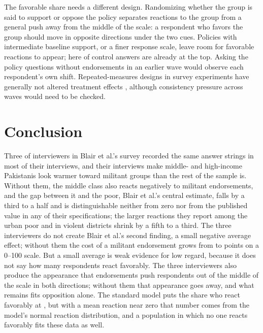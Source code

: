 \documentclass[11pt,letterpaper]{article}
\begin{document}
The favorable share needs a different design. Randomizing whether the group is said to support or oppose the policy separates reactions to the group from a general push away from the middle of the scale: a respondent who favors the group should move in opposite directions under the two cues. Policies with intermediate baseline support, or a finer response scale, leave room for favorable reactions to appear; here \CeilingShare{} of control answers are already at the top. Asking the policy questions without endorsements in an earlier wave would observe each respondent's own shift. Repeated-measures designs in survey experiments have generally not altered treatment effects \citep{clifford2021increasing}, although consistency pressure across waves would need to be checked.

\section{Conclusion}
\label{sec:conclusion}

Three of \InterviewerCount{} interviewers in Blair et al.'s survey recorded the same answer strings in most of their interviews, and their interviews make middle- and high-income Pakistanis look warmer toward militant groups than the rest of the sample is. Without them, the middle class also reacts negatively to militant endorsements, and the gap between it and the poor, Blair et al.'s central estimate, falls by a third to a half and is distinguishable neither from zero nor from the published value in any of their specifications; the larger reactions they report among the urban poor and in violent districts shrink by a fifth to a third. The three interviewers do not create Blair et al.'s second finding, a small negative average effect; without them the cost of a militant endorsement grows from \FullATEPoints{} to \PooledATEPoints{} points on a 0--100 scale. But a small average is weak evidence for low regard, because it does not say how many respondents react favorably. The three interviewers also produce the appearance that endorsements push respondents out of the middle of the scale in both directions; without them that appearance goes away, and what remains fits opposition alone. The standard model puts the share who react favorably at \PrimaryShare{}, but with a mean reaction near zero that number comes from the model's normal reaction distribution, and a population in which no one reacts favorably fits these data as well.



\end{document}
